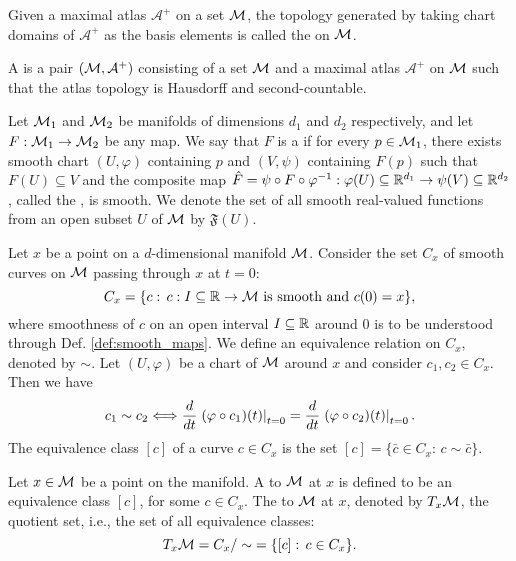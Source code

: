 \documentclass[11pt,a4paper]{article}
\begin{document}
\begin{definition}
Given a maximal atlas $\mathcal{A}^+$ on a set $\mathcal{M}$, the topology generated by taking chart domains of $\mathcal{A}^+$ as the basis elements is called the  on $\mathcal{M}$.
\end{definition}

\begin{definition}
A  is a pair $(\mathcal{M}, \mathcal{A}^+)$ consisting of a set $\mathcal{M}$ and a maximal atlas $\mathcal{A}^+$ on $\mathcal{M}$ such that the atlas topology is Hausdorff and second-countable.
\end{definition}

\begin{definition}\label{def:smooth_maps}
Let $\mathcal{M}_1$ and $\mathcal{M}_2$ be manifolds of dimensions $d_1$ and $d_2$ respectively, and let $F:\mathcal{M}_1\rightarrow \mathcal{M}_2$ be any map. We say that $F$ is a  if for every $p\in \mathcal{M}_1$, there exists smooth chart $(U,\varphi)$ containing $p$ and $(V,\psi)$ containing $F(p)$ such that $F(U)\subseteq V$ and the composite map  $\hat{F} = \psi\circ F\circ \varphi^{-1}:\varphi(U)\subseteq \mathbb{R}^{d_1}\rightarrow \psi(V)\subseteq \mathbb{R}^{d_2}$, called the , is smooth. We denote the set of all smooth real-valued functions from an open subset $U$ of $\mathcal{M}$ by $\mathfrak{F}(U)$.
\end{definition}

Let $x$ be a point on a $d$-dimensional manifold $\mathcal{M}$. Consider the set $C_x$ of smooth curves on $\mathcal{M}$ passing through $x$ at $t=0$:
\begin{equation*}
    C_x = \{ c:\, c:I\subseteq \mathbb{R}\rightarrow \mathcal{M}\text{ is smooth and }c(0) = x \},
\end{equation*}
where smoothness of $c$ on an open interval $I\subseteq \mathbb{R}$ around $0$ is to be understood through Def. \ref{def:smooth_maps}. We define an equivalence relation on $C_x$, denoted by $\sim$. Let $(U,\varphi)$ be a chart of $\mathcal{M}$ around $x$ and consider $c_1,c_2\in C_x$. Then we have
\begin{equation*}
    c_1\sim c_2 \Longleftrightarrow \dfrac{d}{dt}\left.(\varphi\circ c_1)(t)\right|_{t=0} = \dfrac{d}{dt}\left.(\varphi\circ c_2)(t)\right|_{t=0}.
\end{equation*}
The equivalence class $[c]$ of a curve $c\in C_x$ is the set $[c] = \{\bar{c}\in C_x:\, c\sim \bar{c}\}.$

\begin{definition}
Let $x\in \mathcal{M}$ be a point on the manifold. A  to $\mathcal{M}$ at $x$ is defined to be an equivalence class $[c]$, for some $c\in C_x$. The  to $\mathcal{M}$ at $x$, denoted by $T_x\mathcal{M}$, the quotient set, i.e., the set of all equivalence classes:
\begin{equation*}
T_x\mathcal{M} = C_x/\sim\;= \{[c]:\, c\in C_x\}.
\end{equation*}
\end{definition}
\end{document}
